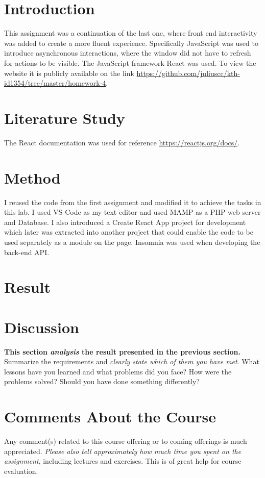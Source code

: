 \documentclass[a4paper]{scrartcl}
\begin{document}
\section{Introduction}

This assignment was a continuation of the last one, where front end interactivity was added to create a more fluent experience. Specifically JavaScript was used to introduce asynchronous interactions, where the window did not have to refresh for actions to be visible. The JavaScript framework React was used. To view the website it is publicly available on the link \href{https://github.com/juliuscc/kth-id1354/tree/master/homework-4}{https://github.com/juliuscc/kth-id1354/tree/master/homework-4}.

\section{Literature Study}

The React documentation was used for reference \href{https://reactjs.org/docs/}{https://reactjs.org/docs/}.

\section{Method}

I reused the code from the first assignment and modified it to achieve the tasks in this lab. I used VS Code as my text editor and used MAMP as a PHP web server and Database. I also introduced a Create React App project for development which later was extracted into another project that could enable the code to be used separately as a module on the page. Insomnia was used when developing the back-end API.

\section{Result}


\section{Discussion}

\textbf{This section \textit{analysis} the result presented in the previous section.} \\

\noindent Summarize the requirements and \textit{clearly state which of them you have met}. What lessons have you learned and what problems did you face? How were the problems solved? Should you have done something differently?

\section{Comments About the Course}

Any comment(s) related to this course offering or to coming offerings is much appreciated. \textit{Please also tell approximately how much time you spent on the assignment}, including lectures and exercises. This is of great help for course evaluation.
\end{document}

